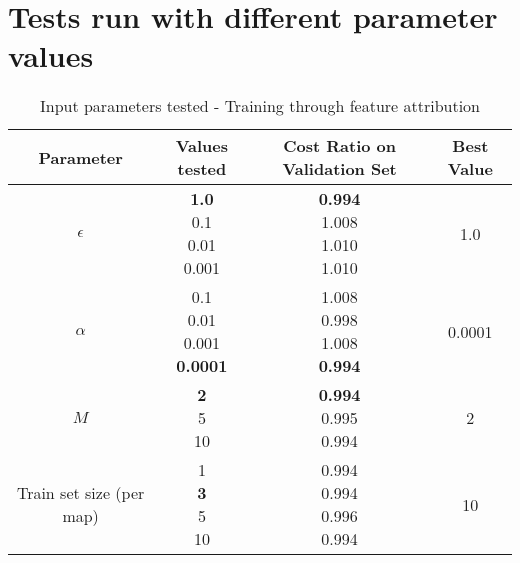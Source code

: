 \appendix
\section{Tests run with different parameter values}
\label{ap:params}

\begin{table}[!ht]
    \centering
    \caption{Input parameters tested - Training through feature attribution}
    \begin{tabular}{|c|c|c|c|}
        \hline
        Parameter & Values tested & Cost Ratio on Validation Set & Best Value \\
        \hline
        $\epsilon$ & \makecell{\textbf{1.0} \\ 0.1 \\ 0.01 \\ 0.001} & \makecell{\textbf{0.994} \\ 1.008 \\ 1.010 \\ 1.010} & 1.0 \\
        \hline
        $\alpha$ & \makecell{0.1 \\ 0.01 \\ 0.001 \\ \textbf{0.0001}} & \makecell{1.008 \\ 0.998 \\ 1.008 \\ \textbf{0.994}} & 0.0001 \\
        \hline
        $M$ & \makecell{\textbf{2} \\ 5 \\ 10} & \makecell{\textbf{0.994} \\ 0.995 \\ 0.994} & 2 \\
        \hline
        Train set size (per map) & \makecell{1 \\ \textbf{3} \\ 5 \\ 10} & \makecell{0.994 \\ 0.994 \\ 0.996 \\ 0.994} & 10 \\
        \hline
    \end{tabular}
    \label{tab:params-features}
\end{table}

